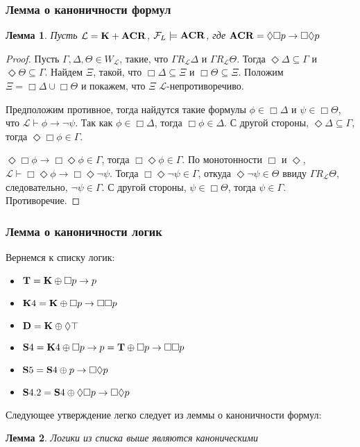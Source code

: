 \documentclass[pdf,utf8,russian,aspectratio=169]{beamer}
\newtheorem{lem}{Лемма}
\begin{document}
\begin{frame}
  \frametitle{Лемма о каноничности формул}
  \begin{lem}
    Пусть $\mathcal{L} = {\bf K} + {\bf ACR}$, $\mathcal{F}_{L} \models {\bf ACR}$, где ${\bf ACR} = \Diamond \Box p \to \Box \Diamond p$
  \end{lem}

  \begin{proof}
    Пусть $\Gamma, \Delta, \Theta \in W_{\mathcal{L}}$, такие, что $\Gamma R_{\mathcal{L}} \Delta$ и $\Gamma R_{\mathcal{L}} \Theta$.
    Тогда $\Diamond \Delta \subseteq \Gamma$ и $\Diamond \Theta \subseteq \Gamma$. Найдем $\Xi$, такой, что
    $\Box \Delta \subseteq \Xi$ и $\Box \Theta \subseteq \Xi$. Положим $\Xi = \Box \Delta \cup \Box \Theta$ и покажем, что
    $\Xi$ $\mathcal{L}$-непротиворечиво.

    Предположим противное, тогда найдутся такие формулы $\phi \in \Box \Delta$ и $\psi \in \Box \Theta$, что $\mathcal{L} \vdash \phi \to \neg \psi$.
    Так как $\phi \in \Box \Delta$, тогда $\Box \phi \in \Delta$. С другой стороны, $\Diamond \Delta \subseteq \Gamma$, тогда $\Diamond \Box \phi \in \Gamma$.

    $\Diamond \Box \phi \to \Box \Diamond \phi \in \Gamma$, тогда $\Box \Diamond \phi \in \Gamma$. По монотонности $\Box$ и $\Diamond$,
    $\mathcal{L} \vdash \Box \Diamond \phi \to \Box \Diamond \neg \psi$. Тогда $\Box \Diamond \neg \psi \in \Gamma$, откуда $\Diamond \neg \psi \in \Theta$ ввиду
    $\Gamma R_{\mathcal{L}} \Theta$, следовательно, $\neg \psi \in \Gamma$. С другой стороны, $\psi \in \Box \Theta$, тогда $\psi \in \Gamma$. Противоречие.
  \end{proof}
\end{frame}

\begin{frame}
  \frametitle{Лемма о каноничности логик}

Вернемся к списку логик:

  \begin{itemize}
    \item ${\bf T} = {\bf K} \oplus \Box p \to p$
    \item ${\bf K}4 = {\bf K} \oplus \Box p \to \Box \Box p$
    \item ${\bf D} = {\bf K} \oplus \Diamond \top$
    \item ${\bf S}4 = {\bf K}4 \oplus \Box p \to p = {\bf T} \oplus \Box p \to \Box \Box p$
    \item ${\bf S}5 = {\bf S}4 \oplus p \to \Box \Diamond p$
    \item ${\bf S}4.2 = {\bf S}4 \oplus \Diamond \Box p \to \Box \Diamond p$
  \end{itemize}

Следующее утверждение легко следует из леммы о каноничности формул:

\begin{lem}
  Логики из списка выше являются каноническими
\end{lem}

\end{frame}
\end{document}
